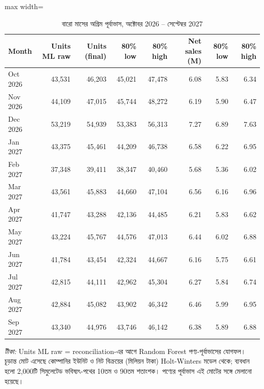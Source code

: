 \begin{table}[htbp]
\centering
\footnotesize
\caption{বারো মাসের অগ্রিম পূর্বাভাস, অক্টোবর 2026 -- সেপ্টেম্বর 2027}
\label{tab:future}
\begin{adjustbox}{max width=\linewidth}
\begin{tabular}{lrrrrrrr}
\toprule
\textbf{Month} & \textbf{Units ML raw} & \textbf{Units (final)} & \textbf{80\% low} & \textbf{80\% high} & \textbf{Net sales (M)} & \textbf{80\% low } & \textbf{80\% high } \\
\midrule
Oct 2026 & 43,531 & 46,203 & 45,021 & 47,478 & 6.08 & 5.83 & 6.34 \\
Nov 2026 & 44,109 & 47,015 & 45,744 & 48,272 & 6.19 & 5.90 & 6.47 \\
Dec 2026 & 53,219 & 54,939 & 53,383 & 56,313 & 7.27 & 6.89 & 7.63 \\
Jan 2027 & 43,375 & 45,461 & 44,209 & 46,738 & 6.58 & 6.22 & 6.95 \\
Feb 2027 & 37,348 & 39,411 & 38,347 & 40,460 & 5.68 & 5.36 & 6.02 \\
Mar 2027 & 43,561 & 45,883 & 44,660 & 47,104 & 6.56 & 6.16 & 6.96 \\
Apr 2027 & 41,747 & 43,288 & 42,136 & 44,485 & 6.21 & 5.83 & 6.62 \\
May 2027 & 43,224 & 45,767 & 44,576 & 47,013 & 6.44 & 6.02 & 6.88 \\
Jun 2027 & 41,784 & 43,454 & 42,324 & 44,667 & 6.16 & 5.75 & 6.61 \\
Jul 2027 & 42,815 & 44,111 & 42,962 & 45,304 & 6.27 & 5.84 & 6.74 \\
Aug 2027 & 42,884 & 45,082 & 43,902 & 46,342 & 6.46 & 5.99 & 6.95 \\
Sep 2027 & 43,340 & 44,976 & 43,746 & 46,142 & 6.38 & 5.89 & 6.88 \\
\bottomrule
\end{tabular}
\end{adjustbox}
\par\smallskip\parbox{0.92\linewidth}{\footnotesize\emph{টীকা:} Units ML raw = reconciliation-এর আগে Random Forest পণ্য-পূর্বাভাসের যোগফল। চূড়ান্ত মোট এসেছে কোম্পানির ইউনিট ও নিট বিক্রয়ের (মিলিয়ন টাকা) Holt-Winters মডেল থেকে; ব্যবধান হলো 2,000টি সিমুলেটেড ভবিষ্যৎ-পথের 10তম ও 90তম শতাংশক। পণ্যের পূর্বাভাস এই মোটের সঙ্গে মেলানো হয়েছে।}
\end{table}